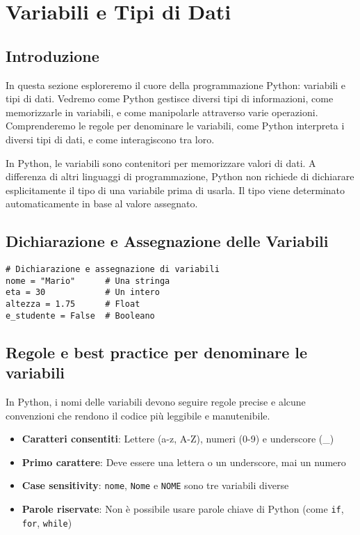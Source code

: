 


\section{Variabili e Tipi di Dati}

\subsection*{Introduzione}
In questa sezione esploreremo il cuore della programmazione Python: variabili e tipi di dati. Vedremo come Python gestisce diversi tipi di informazioni, come memorizzarle in variabili, e come manipolarle attraverso varie operazioni. Comprenderemo le regole per denominare le variabili, come Python interpreta i diversi tipi di dati, e come interagiscono tra loro. 

In Python, le variabili sono contenitori per memorizzare valori di dati. A differenza di altri linguaggi di programmazione, Python non richiede di dichiarare esplicitamente il tipo di una variabile prima di usarla. Il tipo viene determinato automaticamente in base al valore assegnato.

\subsection{Dichiarazione e Assegnazione delle Variabili}\label{bestPractice}
\begin{lstlisting}
# Dichiarazione e assegnazione di variabili
nome = "Mario"      # Una stringa
eta = 30            # Un intero
altezza = 1.75      # Float
e_studente = False  # Booleano
\end{lstlisting}


\subsection{Regole e best practice per denominare le variabili}

In Python, i nomi delle variabili devono seguire regole precise e alcune convenzioni che rendono il codice più leggibile e manutenibile.

\begin{tcolorbox}[colback=blue!5!white,colframe=blue!75!black,title=Regole sintattiche]
\begin{itemize}[leftmargin=*,itemsep=0.5em]
    \item \textbf{Caratteri consentiti}: Lettere (a-z, A-Z), numeri (0-9) e underscore (\_)
    \item \textbf{Primo carattere}: Deve essere una lettera o un underscore, mai un numero
    \item \textbf{Case sensitivity}: \texttt{nome}, \texttt{Nome} e \texttt{NOME} sono tre variabili diverse
    \item \textbf{Parole riservate}: Non è possibile usare parole chiave di Python (come \texttt{if}, \texttt{for}, \texttt{while})
\end{itemize}
\end{tcolorbox}

